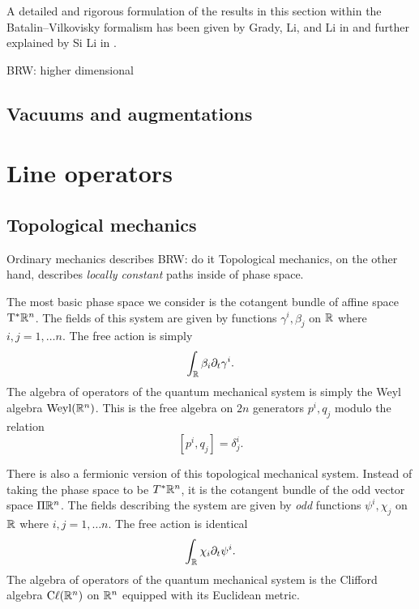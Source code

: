 \documentclass[11pt]{amsart}
\def\brian#1{{\textcolor{blue!65!red}{BRW: {#1}}}}
\begin{document}
A detailed and rigorous formulation of the results in this section within the Batalin--Vilkovisky formalism has been given by Grady, Li, and Li in \cite{GLL} and further explained by Si Li in \cite{LiVertex}.

\brian{higher dimensional}

\subsection{Vacuums and augmentations}


\section{Line operators}
\label{sec:lines}


\subsection*{Topological mechanics}


Ordinary mechanics describes \brian{do it}
Topological mechanics, on the other hand, describes {\em locally constant} paths inside of phase space.

The most basic phase space we consider is the cotangent bundle of affine space ${\rm T}^* \mathbb R^n$.
The fields of this system are given by functions $\gamma^i, \beta_j$ on $\mathbb R$ where $i,j=1,\ldots n$. 
The free action is simply
\[
\int_\mathbb R \beta_i \partial_t \gamma^i .
\]
The algebra of operators of the quantum mechanical system is simply the Weyl algebra ${\rm Weyl}(\mathbb R^n)$.
This is the free algebra on $2n$ generators $p^i, q_j$ modulo the relation
\[
[p^i, q_j] = \delta^i_j .
\]

There is also a fermionic version of this topological mechanical system. 
Instead of taking the phase space to be $T^* \mathbb R^n$, it is the cotangent bundle of the odd vector space $\Pi \mathbb R^n$.
The fields describing the system are given by {\em odd} functions $\psi^i, \chi_j$ on $\mathbb R$ where $i,j=1,\ldots n$. 
The free action is identical
\[
\int_\mathbb R \chi_i \partial_t \psi^i .
\]
The algebra of operators of the quantum mechanical system is the Clifford algebra ${\rm C}\ell(\mathbb R^n)$ on $\mathbb R^n$ equipped with its Euclidean metric. 
\end{document}
